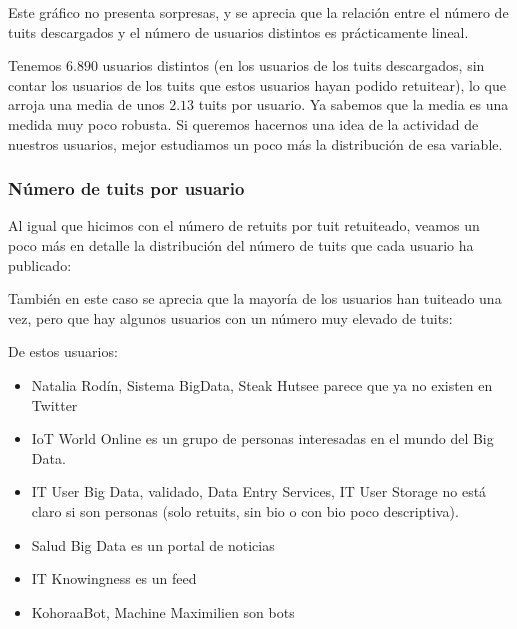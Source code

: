 
Este gráfico no presenta sorpresas, y se aprecia que la relación entre el número de tuits descargados y el número de usuarios distintos es prácticamente lineal.

Tenemos $6.890$ usuarios distintos (en los usuarios de los tuits descargados, sin contar los usuarios de los tuits que estos usuarios hayan podido retuitear), lo que arroja una media de unos $2.13$ tuits por usuario. Ya sabemos que la media es una medida muy poco robusta. Si queremos hacernos una idea de la actividad de nuestros usuarios, mejor estudiamos un poco más la distribución de esa variable.

\subsubsection{Número de tuits por usuario}
Al igual que hicimos con el número de retuits por tuit retuiteado, veamos un poco más en detalle
la distribución del número de tuits que cada usuario ha publicado:


También en este caso se aprecia que la mayoría de los usuarios han tuiteado una vez, pero que hay algunos usuarios con un número muy elevado de tuits:


De estos usuarios:
\begin{itemize}
\setlength\itemsep{-0.1cm}
\item Natalia Rodín, Sistema BigData, Steak Hutsee parece que ya no existen en Twitter
\item IoT World Online es un grupo de personas interesadas en el mundo del Big Data.
\item IT User Big Data, validado, Data Entry Services, IT User Storage no está claro si son personas (solo retuits, sin bio o con bio poco descriptiva).
\item Salud Big Data es un portal de noticias
\item IT Knowingness es un feed 
\item KohoraaBot, Machine Maximilien son bots
\end{itemize}

